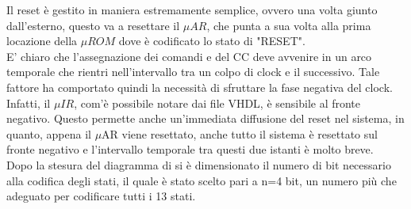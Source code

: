 \documentclass[a4paper, titlepage]{article}
\begin{document}
Il reset è gestito in maniera estremamente semplice, ovvero una volta giunto dall'esterno, questo va a resettare il $\mu AR$, che punta a sua volta alla prima locazione della $\mu ROM$ dove è codificato lo stato di "RESET".\\ E' chiaro che l'assegnazione dei comandi e del CC deve avvenire in un arco temporale che rientri nell'intervallo tra un colpo di clock e il successivo. Tale fattore ha comportato quindi la necessità di sfruttare la fase negativa del clock. Infatti, il $\mu IR$, com'è possibile notare dai file VHDL, è sensibile al fronte negativo. Questo permette anche un'immediata diffusione del reset nel sistema, in quanto, appena il $\mu$AR viene resettato, anche tutto il sistema è resettato sul fronte negativo e l'intervallo temporale tra questi due istanti è molto breve. \\
Dopo la stesura del diagramma di si è dimensionato il numero di bit necessario alla codifica degli stati, il quale è stato scelto pari a n=4 bit, un numero più che adeguato per codificare tutti i 13 stati.
\end{document}
